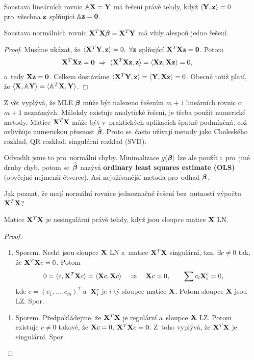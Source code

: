 \begin{lemma}
	Soustava lineárních rovnic $\mathbb{A}\mathbf{X} = \mathbf{Y}$ má řešení právě tehdy, když $\langle \mathbf{Y},\mathbf{z}\rangle = 0$ pro~všechna $\mathbf{z}$ splňující $\mathbb{A}\mathbf{z} = \boldsymbol{0}$.
\end{lemma}
\begin{theorem}
	Soustava normálních rovnic $\mathbf{X}^T\mathbf{X}\boldsymbol{\beta} = \mathbf{X}^T\mathbf{Y}$ má vždy alespoň jedno řešení.
	\begin{proof}
		Musíme ukázat, že $\langle \mathbf{X}^T\mathbf{Y},\mathbf{z}\rangle = 0,~\forall\mathbf{z}$ splňující $\mathbf{X}^T\mathbf{X}\mathbf{z} = \boldsymbol{0}$. Potom
		 $$\mathbf{X}^T\mathbf{X}\mathbf{z} = \boldsymbol{0}~\Rightarrow~\langle \mathbf{X}^T\mathbf{X}\mathbf{z},\mathbf{z}\rangle = \langle \mathbf{X}\mathbf{z},\mathbf{X}\mathbf{z}\rangle = 0,$$ a~tedy $\mathbf{X}\mathbf{z} = \boldsymbol{0}$. Celkem dostáváme $\langle\mathbf{X}^T\mathbf{Y},\mathbf{z}\rangle = \langle\mathbf{Y},\mathbf{X}\mathbf{z}\rangle = 0$. Obecně totiž platí, že $\langle \mathbf{X},\mathbb{A}\mathbf{Y}\rangle = \langle \mathbb{A}^T\mathbf{X},\mathbf{Y}\rangle$.
	\end{proof}
\end{theorem}
\begin{remark}
	Z vět vyplývá, že MLE $\boldsymbol{\beta}$ může být nalezeno řešením $m+1$ lineárních rovnic o~$m+1$ neznámých. Málokdy existuje analytické řešení, je třeba použít numerické metody. Matice $\mathbf{X}^T\mathbf{X}$ může být v~praktických aplikacích špatně podmíněná, což ovlivňuje numerickou přesnost $\widehat{\boldsymbol{\beta}}$. Proto se~často užívají metody jako Choleského rozklad, QR rozklad, singulární rozklad (SVD).
	
	Odvodili jsme to pro~normální chyby. Minimalizace $g(\boldsymbol{\beta})$ lze ale použít i~pro~jiné druhy chyb, potom se~$\widehat{\boldsymbol{\beta}}$ nazývá \textbf{ordinary least squares estimate (OLS)} (obyčejné nejmenší čtverce). Asi nejužívanější metoda  pro~odhad $\boldsymbol{\beta}$.
	
	Jak poznat, že mají normální rovnice jednoznačné řešení bez~nutnosti výpočtu $\mathbf{X}^T\mathbf{X}$?
\end{remark}
\begin{theorem}
	Matice $\mathbf{X}^T\mathbf{X}$ je nesingulární právě tehdy, když jsou sloupce matice $\mathbf{X}$ LN.
	\begin{proof}
		\begin{enumerate}[$\Leftarrow$]
			\item Sporem. Nechť jsou sloupce $\mathbf{X}$ LN a~matice $\mathbf{X}^T\mathbf{X}$ singulární, tzn. $\exists c\neq0$ tak, že $\mathbf{X}^T\mathbf{X} c = 0$. Potom
			 $$ 0 = \langle c,\mathbf{X}^T\mathbf{X} c\rangle = \langle \mathbf{X} c,\mathbf{X} c\rangle\quad \Rightarrow\quad\mathbf{X} c = 0,\qquad\sum c_i\mathbf{X}_i^c = 0, $$
			kde $c = (c_1,\dots,c_m)^T$ a~$\mathbf{X}_i^c$ je $i$-tý sloupec matice $\mathbf{X}$. Potom sloupce $\mathbf{X}$ jsou LZ. Spor.
		\end{enumerate}
	\begin{enumerate}[$\Rightarrow$]
	\item Sporem. Předpokládejme, že $\mathbf{X}^T\mathbf{X}$ je regulární a~sloupce $\mathbf{X}$ LZ. Potom existuje $c\neq0$ takové, že $\mathbf{X} c = 0$, $\mathbf{X}^T\mathbf{X} c = 0$. Z~toho vyplývá, že $\mathbf{X}^T\mathbf{X}$ je singulární. Spor.
\end{enumerate}
	\end{proof}
\end{theorem}
